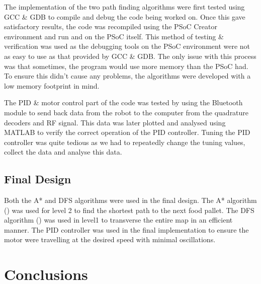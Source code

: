 \documentclass{article}
\begin{document}
The implementation of the two path finding algorithms were first tested using GCC \& GDB to compile and debug the code being worked on. Once this gave satisfactory results, the code was recompiled using the PSoC Creator environment and run and on the PSoC itself. This method of testing \& verification was used as the debugging tools on the PSoC environment were not as easy to use as that provided by GCC \& GDB. The only issue with this process was that sometimes, the program would use more memory than the PSoC had. To ensure this didn't cause any problems, the algorithms were developed with a low memory footprint in mind.

The PID \& motor control part of the code was tested by using the Bluetooth module to send back data from the robot to the computer from the quadrature decoders and RF signal. This data was later plotted and analysed using MATLAB to verify the correct operation of the PID controller. Tuning the PID controller was quite tedious as we had to repeatedly change the tuning values, collect the data and analyse this data.

\subsection{Final Design}

Both the A* and DFS algorithms were used in the final design. The A* algorithm () was used for level 2 to find the shortest path to the next food pallet. The DFS algorithm () was used in level1 to transverse the entire map in an efficient manner. The PID controller was used in the final implementation to ensure the motor were travelling at the desired speed with minimal oscillations.


\section{Conclusions}
\end{document}
